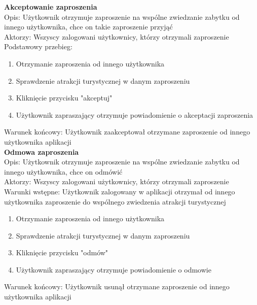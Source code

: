     \textbf{Akceptowanie zaproszenia} \\
        Opis: Użytkownik otrzymuje zaproszenie na wspólne zwiedzanie zabytku od innego użytkownika, chce on takie zaproszenie przyjąć \\
        Aktorzy: Wszyscy zalogowani użytkownicy, którzy otrzymali zaproszenie \\
        Podstawowy przebieg:
        \begin{enumerate}
            \item Otrzymanie zaproszenia od innego użytkownika
            \item Sprawdzenie atrakcji turystycznej w danym zaproszeniu
            \item Kliknięcie przycisku "akceptuj"
            \item Użytkownik zapraszający otrzymuje powiadomienie o akceptacji zaproszenia
        \end{enumerate}
        Warunek końcowy: Użytkownik zaakceptował otrzymane zaproszenie od innego użytkownika aplikacji \\

    \textbf{Odmowa zaproszenia} \\ 
        Opis: Użytkownik otrzymuje zaproszenie na wspólne zwiedzanie zabytku od innego użytkownika, chce on odmówić \\
        Aktorzy: Wszyscy zalogowani użytkownicy, którzy otrzymali zaproszenie \\
        Warunki wstępne: Użytkownik zalogowany w aplikacji otrzymał od innego użytkownika zaproszenie do wspólnego zwiedzenia atrakcji turystycznej
        \begin{enumerate}
            \item Otrzymanie zaproszenia od innego użytkownika
            \item Sprawdzenie atrakcji turystycznej w danym zaproszeniu
            \item Kliknięcie przycisku "odmów"
            \item Użytkownik zapraszający otrzymuje powiadomienie o odmowie
        \end{enumerate}
        Warunek końcowy: Użytkownik usunął otrzymane zaproszenie od innego użytkownika aplikacji \\

